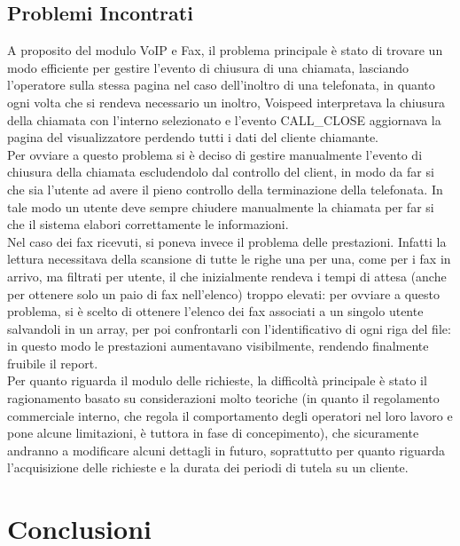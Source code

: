 \section{Problemi Incontrati}
A proposito del modulo VoIP e Fax, il problema principale \`e stato di trovare un modo efficiente per gestire l'evento di chiusura di una chiamata, lasciando l'operatore sulla stessa pagina nel caso dell'inoltro di una telefonata, in quanto ogni volta che si rendeva necessario un inoltro, Voispeed interpretava la chiusura della chiamata con l'interno selezionato e  l'evento CALL\_CLOSE aggiornava la pagina del visualizzatore perdendo tutti i dati del cliente chiamante. \\
Per ovviare a questo problema si \`e deciso di gestire manualmente l'evento di chiusura della chiamata escludendolo dal controllo del client, in modo da far si che sia l'utente ad avere il pieno controllo della terminazione della telefonata. In tale modo un utente deve sempre chiudere manualmente la chiamata per far si che il sistema elabori correttamente le informazioni.\\
Nel caso dei fax ricevuti, si poneva invece il problema delle prestazioni. Infatti la lettura necessitava della scansione di tutte le righe una per una, come per i fax in arrivo, ma filtrati per utente, il che inizialmente rendeva i tempi di attesa (anche per ottenere solo un paio di fax nell'elenco) troppo elevati: per ovviare a questo problema, si \`e scelto di ottenere l'elenco dei fax associati a un singolo utente salvandoli in un array, per poi confrontarli con l'identificativo di ogni riga del file: in questo modo le prestazioni aumentavano visibilmente, rendendo finalmente fruibile il report. \\
Per quanto riguarda il modulo delle richieste, la difficolt\`a principale \`e stato il ragionamento basato su considerazioni molto teoriche (in quanto il regolamento commerciale interno, che regola il comportamento degli operatori nel loro lavoro e pone alcune limitazioni, \`e tuttora in fase di concepimento), che sicuramente andranno a modificare alcuni dettagli in futuro, soprattutto per quanto riguarda l'acquisizione delle richieste e la durata dei periodi di tutela su un cliente.

\chapter{Conclusioni}


